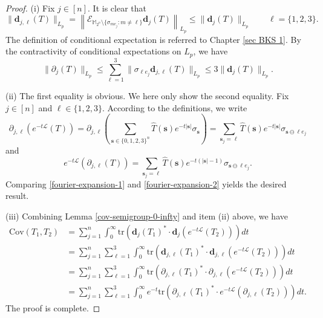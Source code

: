 \documentclass{amsbook}
\theoremstyle{definition}
\theoremstyle{remark}
\numberwithin{section}{chapter}
\numberwithin{equation}{chapter}
\newcommand{\M}{\mathbb{M}}
\newcommand{\1}{\mathbf{1}}
\newcommand{\s}{\mathbf{s}}
\newcommand{\La}{\mathcal{L}}
\newcommand{\dc}{\mathbf{d}}
\begin{document}
\begin{proof}
	(i) Fix $j\in [n]$. It is clear that  $$\|\dc_{j,\ell}(T)\|_{L_{p}}=\left\|\mathcal{E}_{\M_{2^{n}}\setminus\{\sigma_{me_{j}}:m\neq \ell\}}\dc_{j}(T)\right\|_{L_{p}}\leq \|\dc_{j}(T)\|_{L_{p}}\qquad \ell=\{1,2,3\}.$$ 
	The definition of conditional expectation is referred to Chapter \ref{sec BKS 1}. By the contractivity of conditional expectations on \(L_p\), we have
	$$\|\partial_{j}(T)\|_{L_{p}}\leq \sum_{\ell=1}^{3}\|\sigma_{\ell e_{j}}\dc_{j,\ell}(T)\|_{L_{p}}\leq 3\|\dc_{j}(T)\|_{L_{p}}.$$
	
	(ii) The first equality is obvious. We here only show the second equality. Fix $j\in [n]$ and $\ell\in \{1,2,3\}$. 
According to the definitions, we write
\begin{equation}\label{fourier-expansion-1}
	\partial_{j,\ell}\left(e^{-t\La}(T)\right)=\partial_{j,\ell}\left(\sum_{\s\in\{0,1,2,3\}^{n}}\widehat{T}(\s)e^{-t|\s|}\sigma_{\s}\right)=\sum_{\s_{j}=\ell}\widehat{T}(\s)e^{-t|\s|}\sigma_{\s\ominus \ell e_{j}}
\end{equation}
and
\begin{equation}\label{fourier-expansion-2}
	e^{-t\La}\left(\partial_{j,\ell}(T)\right)=\sum_{\s_{j}=\ell}\widehat{T}(\s)e^{-t(|\s|-1)}\sigma_{\s\ominus \ell e_{j}}.
\end{equation}
Comparing \eqref{fourier-expansion-1} and \eqref{fourier-expansion-2} yields the desired result. 

	(iii) Combining Lemma \ref{cov-semigroup-0-infty} and item (ii) above, we have	\begin{equation*}\label{covariance-1}
	\begin{split}
		\mathrm{Cov}(T_1,T_2)
		&=\sum_{j=1}^{n}\int_{0}^{\infty}\mathrm{tr}\left(\dc_{j}(T_1)^*\cdot \dc_{j}(e^{-t\La}(T_2))\right)dt\\
		&=\sum_{j=1}^{n}\sum_{\ell=1}^{3}\int_{0}^{\infty}\mathrm{tr}\left(\dc_{j,\ell}(T_1)^*\cdot \dc_{j,\ell}\left(e^{-t\La}(T_2)\right)\right)dt\\
		&=\sum_{j=1}^{n}\sum_{\ell=1}^{3}\int_{0}^{\infty}\mathrm{tr}\left(\partial_{j,\ell}(T_1)^*\cdot \partial_{j,\ell}\left(e^{-t\La}(T_2)\right)\right)dt\\
		&=\sum_{j=1}^{n}\sum_{\ell=1}^{3}\int_{0}^{\infty}e^{-t}\mathrm{tr}\left(\partial_{j,\ell}(T_1)^*\cdot e^{-t\La}\left(\partial_{j,\ell}(T_2)\right)\right)dt.
	\end{split}
\end{equation*}
The proof is complete.
\end{proof}
\end{document}
